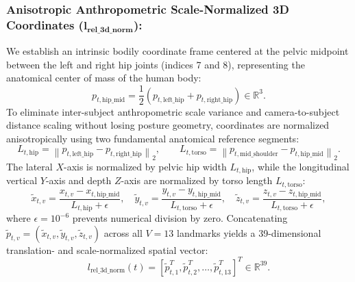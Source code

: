 \documentclass[runningheads]{llncs}
\begin{document}
\subsubsection{Anisotropic Anthropometric Scale-Normalized 3D Coordinates ($\mathbf{l_{\text{rel\_3d\_norm}}}$):}
We establish an intrinsic bodily coordinate frame centered at the pelvic midpoint between the left and right hip joints (indices 7 and 8), representing the anatomical center of mass of the human body:
\begin{equation}
    p_{t, \text{hip\_mid}} = \frac{1}{2}\left( p_{t, \text{left\_hip}} + p_{t, \text{right\_hip}} \right) \in \mathbb{R}^3.
\end{equation}
To eliminate inter-subject anthropometric scale variance and camera-to-subject distance scaling without losing posture geometry, coordinates are normalized anisotropically using two fundamental anatomical reference segments:
\begin{equation}
    L_{t, \text{hip}} = \left\| p_{t, \text{left\_hip}} - p_{t, \text{right\_hip}} \right\|_2, \qquad L_{t, \text{torso}} = \left\| p_{t, \text{mid\_shoulder}} - p_{t, \text{hip\_mid}} \right\|_2.
\end{equation}
The lateral $X$-axis is normalized by pelvic hip width $L_{t, \text{hip}}$, while the longitudinal vertical $Y$-axis and depth $Z$-axis are normalized by torso length $L_{t, \text{torso}}$:
\begin{equation}
    \tilde{x}_{t, v} = \frac{x_{t, v} - x_{t, \text{hip\_mid}}}{L_{t, \text{hip}} + \epsilon}, \quad \tilde{y}_{t, v} = \frac{y_{t, v} - y_{t, \text{hip\_mid}}}{L_{t, \text{torso}} + \epsilon}, \quad \tilde{z}_{t, v} = \frac{z_{t, v} - z_{t, \text{hip\_mid}}}{L_{t, \text{torso}} + \epsilon},
\end{equation}
where $\epsilon = 10^{-6}$ prevents numerical division by zero. Concatenating $\tilde{p}_{t, v} = (\tilde{x}_{t, v}, \tilde{y}_{t, v}, \tilde{z}_{t, v})$ across all $V=13$ landmarks yields a 39-dimensional translation- and scale-normalized spatial vector:
\begin{equation}
    l_{\text{rel\_3d\_norm}}(t) = \left[ \tilde{p}_{t, 1}^T, \tilde{p}_{t, 2}^T, \dots, \tilde{p}_{t, 13}^T \right]^T \in \mathbb{R}^{39}.
\end{equation}
\end{document}
